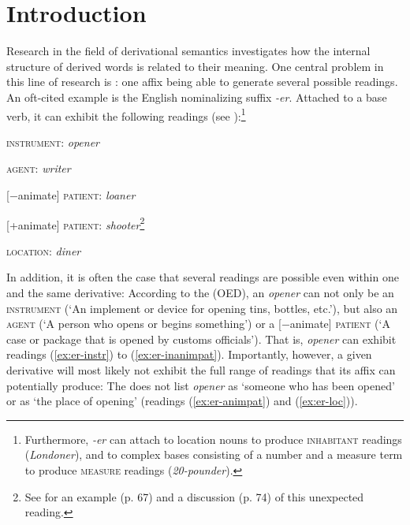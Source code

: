 \chapter[Introduction]{Introduction}\label{ch:intro}\largerpage

Research in the field of derivational semantics investigates how the internal structure of derived words is related to their meaning. One central problem in this line of research is : one affix being able to generate several possible readings. An oft-cited example is the English nominalizing suffix \textit{-er}. Attached to a base verb, it can exhibit the following readings (see \citealt{Bauer.2013,Lieber.2016}):\footnote{Furthermore, \textit{-er} can attach to location nouns to produce \textsc{inhabitant} readings (\textit{Londoner}), and to complex bases consisting of a number and a measure term to produce \textsc{measure} readings (\textit{20-pounder}).} 

\begin{exe}
	\ex 
	\begin{xlist}
		\item \label{ex:er-instr} \textsc{instrument}: \textit{opener}
		\item \textsc{agent}: \textit{writer}
		\item \label{ex:er-inanimpat} [−animate] \textsc{patient}: \textit{loaner}
		\item \label{ex:er-animpat} [+animate] \textsc{patient}: \textit{shooter}\footnote{See \citet[]{Lieber.2016} for an example (p. 67) and a discussion (p. 74) of this unexpected reading.}
		\item \label{ex:er-loc} \textsc{location}: \textit{diner}
	\end{xlist}
\end{exe}

\noindent
In addition, it is often the case that several readings are possible even within one and the same derivative: According to the \citeauthor{OED} (OED), an \textit{opener} can not only be an \textsc{instrument} (`An implement or device for opening tins, bottles, etc.'), but also an \textsc{agent} (`A person who opens or begins something') or a [−animate] \textsc{patient} (`A case or package that is opened by customs officials'). That is, \textit{opener} can exhibit readings (\ref{ex:er-instr}) to (\ref{ex:er-inanimpat}).
Importantly, however, a given derivative will most likely not exhibit the full range of readings that its affix can potentially produce: The  does not list \textit{opener} as `someone who has been opened' or as `the place of opening' (readings (\ref{ex:er-animpat}) and (\ref{ex:er-loc})). 


